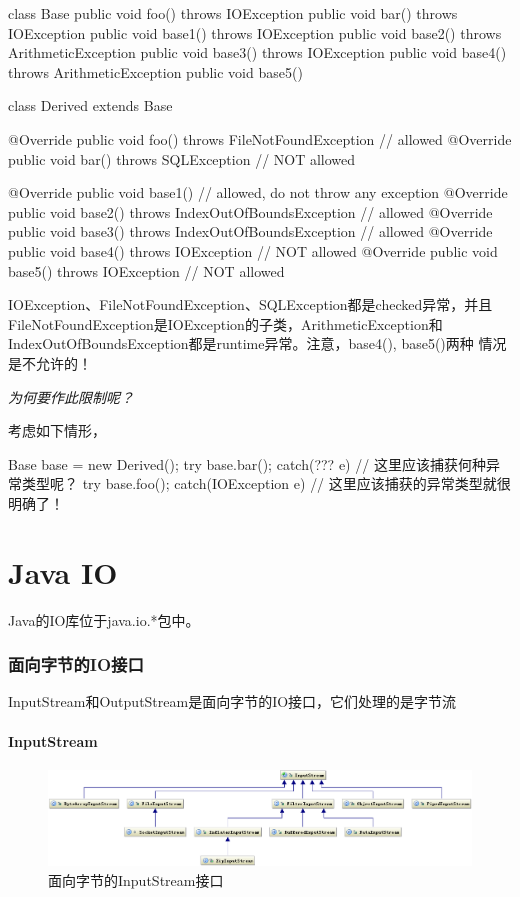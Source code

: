 \documentclass[a4paper,11pt]{article}
\begin{document}
\begin{javacode}
class Base {
  public void foo() throws IOException { }
  public void bar() throws IOException { }
  public void base1() throws IOException { }
  public void base2() throws ArithmeticException { }
  public void base3() throws IOException { }
  public void base4() throws ArithmeticException { }
  public void base5() { }
}

class Derived extends Base {
  @Override
  public void foo() throws FileNotFoundException { } // allowed
  @Override
  public void bar() throws SQLException { } // NOT allowed

  @Override
  public void base1() { } // allowed, do not throw any exception
  @Override
  public void base2() throws IndexOutOfBoundsException { } // allowed
  @Override
  public void base3() throws IndexOutOfBoundsException { } // allowed
  @Override
  public void base4() throws IOException { } // NOT allowed
  @Override
  public void base5() throws IOException { } // NOT allowed
}
\end{javacode}

IOException、FileNotFoundException、SQLException都是checked异常，并且
FileNotFound\-Exception是IOException的子类，ArithmeticException和
IndexOutOfBoundsException都是runtime异常。注意，base4(), base5()两种
情况是不允许的！

\emph{为何要作此限制呢？}

考虑如下情形，

\begin{javacode}
Base base = new Derived();
try {
  base.bar();
} catch(??? e) {
  // 这里应该捕获何种异常类型呢？
}
try {
  base.foo();
} catch(IOException e) {
  // 这里应该捕获的异常类型就很明确了！
}
\end{javacode}


\part[Java IO]{Java IO}
Java的IO库位于java.io.*包中。

\section[面向字节的IO接口]{面向字节的IO接口}
InputStream和OutputStream是面向字节的IO接口，它们处理的是字节流

\subsection[InputStream]{InputStream}
\begin{figure}
  \centering
  \includegraphics[width=.9\textwidth]{picturedir/inputstream.png}
  \caption{面向字节的InputStream接口}
  \label{fig:inputstream}
\end{figure}
\end{document}
